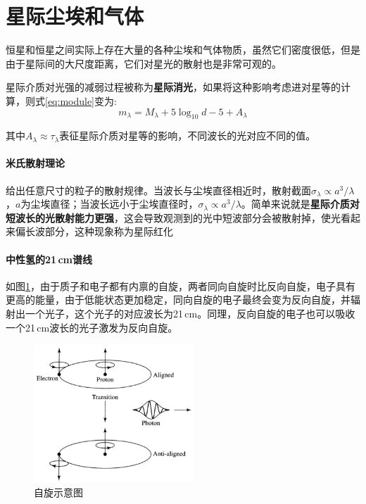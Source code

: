 \documentclass[openany]{ctexbook}
\begin{document}
\section{星际尘埃和气体}
恒星和恒星之间实际上存在大量的各种尘埃和气体物质，虽然它们密度很低，但是由于星际间的大尺度距离，它们对星光的散射也是非常可观的。

星际介质对光强的减弱过程被称为\textbf{星际消光}，如果将这种影响考虑进对星等的计算，则式\ref{eq:module}变为:
\begin{equation}
  m_\lambda=M_\lambda+5\log_{10}d-5+A_\lambda
\end{equation}

其中$A_\lambda \approx \tau_\lambda$表征星际介质对星等的影响，不同波长的光对应不同的值。

\paragraph{米氏散射理论}
给出任意尺寸的粒子的散射规律。当波长与尘埃直径相近时，散射截面$\sigma_\lambda \propto a^3/\lambda$，$a$为尘埃直径；当波长远小于尘埃直径时，$\sigma_\lambda \propto a^3/\lambda$。简单来说就是\textbf{星际介质对短波长的光散射能力更强}，这会导致观测到的光中短波部分会被散射掉，使光看起来偏长波部分，这种现象称为星际红化


\paragraph{中性氢的21\,cm谱线}
如图\ref{fig:21cm}，由于质子和电子都有内禀的自旋，两者同向自旋时比反向自旋，电子具有更高的能量，由于低能状态更加稳定，同向自旋的电子最终会变为反向自旋，并辐射出一个光子，这个光子的对应波长为21\,cm。同理，反向自旋的电子也可以吸收一个21\,cm波长的光子激发为反向自旋。

\begin{figure}[hbt]
  \centering
  \includegraphics[width=6cm]{chapters/12/21cm}
  \caption{自旋示意图}
  \label{fig:21cm}
\end{figure}
\end{document}
